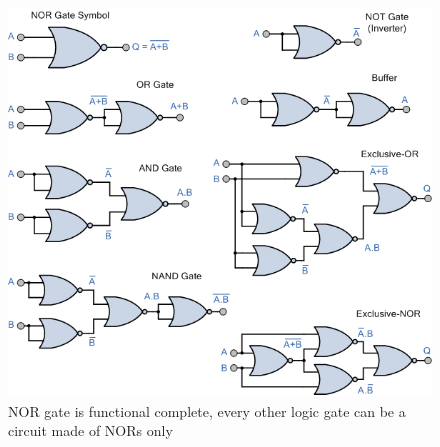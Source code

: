 \documentclass{article}
\begin{document}
\begin{figure}[h]
    \centering
    \includegraphics[scale=.5]{IM_NOR_allpowerful.png}
    \caption{NOR gate is functional complete, every other logic gate can be a circuit made of NORs only}
    \label{NOR_allpowerful}
\end{figure}
\end{document}
